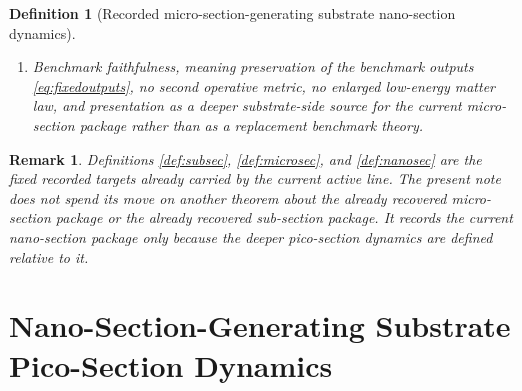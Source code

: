 \documentclass[11pt]{article}
\newcommand{\MicroSectionShell}[1]{\mathcal Z_{#1}^{\mathrm{microsec}}}
\newcommand{\NanoSectionProj}[1]{\Pi_{#1}^{\mathrm{nanosec}}}
\newcommand{\NanoSectionFiber}[2]{\mathcal F_{#1}^{\mathrm{nanosec}}(#2)}
\newcommand{\NanoSectionFunctional}[1]{\mathscr N_{#1}^{\mathrm{nanosec}}}
\newcommand{\NanoSectionShell}[1]{\mathcal Z_{#1}^{\mathrm{nanosec}}}
\newtheorem{definition}{Definition}
\newtheorem{remark}{Remark}
\begin{document}
\begin{definition}[Recorded micro-section-generating substrate nano-section dynamics]
\begin{enumerate}
\[\begin{array}{l}
    \NanoSectionFunctional{\sigma}(p)
    =
    \displaystyle\min_{q\in\NanoSectionFiber{\sigma}{\NanoSectionProj{\sigma}(p)}}
    \NanoSectionFunctional{\sigma}(q)
    \end{array}
    \right\},
    \]
    and
    \[
    \NanoSectionProj{\sigma}\big|_{\NanoSectionShell{\sigma}}
    :
    \NanoSectionShell{\sigma}
    \xrightarrow{\cong}
    \MicroSectionShell{\sigma}
    \]
    is a diffeomorphism.
    \item Benchmark faithfulness, meaning preservation of the benchmark outputs \eqref{eq:fixedoutputs}, no second operative metric, no enlarged low-energy matter law, and presentation as a deeper substrate-side source for the current micro-section package rather than as a replacement benchmark theory.
\end{enumerate}
\end{definition}

\begin{remark}
Definitions \ref{def:subsec}, \ref{def:microsec}, and \ref{def:nanosec} are the fixed recorded targets already carried by the current active line. The present note does not spend its move on another theorem about the already recovered micro-section package or the already recovered sub-section package. It records the current nano-section package only because the deeper pico-section dynamics are defined relative to it.
\end{remark}

\section{Nano-Section-Generating Substrate Pico-Section Dynamics}
\end{document}

